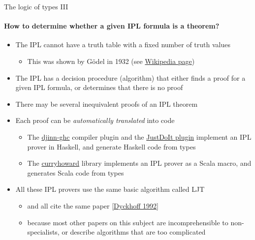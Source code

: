 \documentclass[english]{beamer}
\begin{document}
\begin{frame}{The logic of types III}


\framesubtitle{How to determine whether a given IPL formula is a theorem?}
\begin{itemize}
\item The IPL cannot have a truth table with a fixed number of truth values
\begin{itemize}
\item This was shown by G\"odel in 1932 (see \href{https://en.wikipedia.org/wiki/Many-valued_logic}{Wikipedia page})
\end{itemize}
\item The IPL has a decision procedure (algorithm) that either finds a proof
for a given IPL formula, or determines that there is no proof
\item There may be several inequivalent proofs of an IPL theorem
\item Each proof can be \emph{automatically translated} into code
\begin{itemize}
\item The \href{https://hackage.haskell.org/package/djinn-ghc}{djinn-ghc}
compiler plugin and the \href{https://github.com/nomeata/ghc-justdoit}{JustDoIt plugin}
implement an IPL prover in Haskell, and generate Haskell code from
types
\item The \href{https://github.com/Chymyst/curryhoward}{curryhoward} library
implements an IPL prover as a Scala macro, and generates Scala code
from types
\end{itemize}
\item All these IPL provers use the same basic algorithm called LJT 
\begin{itemize}
\item and all cite the same paper {\footnotesize{}\href{https://rd.host.cs.st-andrews.ac.uk/publications/jsl57.pdf}{[Dyckhoff 1992]}}{\footnotesize \par}
\item because most other papers on this subject are incomprehensible to
non-specialists, or describe algorithms that are too complicated
\end{itemize}
\end{itemize}
\end{frame}
\end{document}
